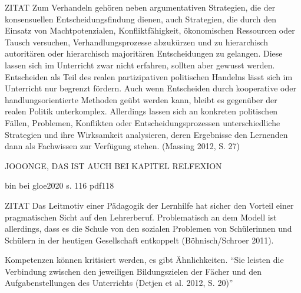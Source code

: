 ZITAT
 Zum Verhandeln gehören neben argumentativen Strategien, die der konsensuellen Entscheidungsfindung dienen, auch Strategien, die durch den Einsatz von Machtpotenzialen, Konfliktfähigkeit, ökonomischen Ressourcen oder Tausch versuchen, Verhandlungsprozesse abzukürzen und zu hierarchisch autoritären oder hierarchisch majoritären Entscheidungen zu gelangen. Diese lassen sich im Unterricht zwar nicht erfahren, sollten aber gewusst werden. Entscheiden als Teil des realen partizipativen politischen Handelns lässt sich im Unterricht nur begrenzt fördern. Auch wenn Entscheiden durch kooperative oder handlungsorientierte Methoden geübt werden kann, bleibt es gegenüber der realen Politik unterkomplex. Allerdings lassen sich an konkreten politischen Fällen, Problemen, Konflikten oder Entscheidungsprozessen unterschiedliche Strategien und ihre Wirksamkeit analysieren, deren Ergebnisse den Lernenden dann als Fachwissen zur Verfügung stehen. (Massing 2012, S. 27)

JOOONGE, DAS IST AUCH BEI KAPITEL RELFEXION

bin bei gloe2020 s. 116 pdf118


ZITAT
Das Leitmotiv einer Pädagogik der Lernhilfe hat sicher den Vorteil einer pragmatischen Sicht auf den Lehrerberuf. Problematisch an dem Modell ist allerdings, dass es die Schule von den sozialen Problemen von Schülerinnen und Schülern in der heutigen Gesellschaft entkoppelt (Böhnisch/Schroer 2011). \autocite[51]{Sander.2016}

Kompetenzen können kritisiert werden, es gibt Ähnlichkeiten. \enquote{Sie leisten die Verbindung zwischen den jeweiligen Bildungszielen der Fächer und den Aufgabenstellungen des Unterrichts (Detjen et al. 2012, S. 20)} \autocite[18]{Massing.2022}

